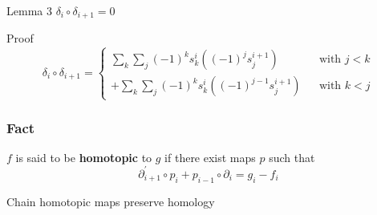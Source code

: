 \documentclass[10pt,xcolor=table,dvipsnames]{beamer}
\begin{document}
\begin{frame}[fragile]
        \begin{block}{Lemma 3}
        $\delta_{i}\circ \delta_{i+1}=0$
        \end{block}
        \begin{block}{Proof}
\begin{equation*}
\delta _{i}\circ \delta _{i+1}=\left\{
\begin{array}{ccc}
\sum\limits_{k}\sum\limits_{j}\left( -1\right) ^{k}s_{k}^{i}\left( \left(
-1\right) ^{j}s_{j}^{i+1}\right)  &  & \text{with }j<k \\
+\sum\limits_{k}\sum\limits_{j}\left( -1\right) ^{k}s_{k}^{i}\left( \left(
-1\right) ^{j-1}s_{j}^{i+1}\right)  &  & \text{with }k<j%
\end{array}%
\right.
\end{equation*}
        \end{block}
\end{frame}

\begin{frame}[fragile]
\frametitle{Fact}
\begin{center}
\end{center}

$f$ is said to be \textbf{homotopic} to $g$ if there exist maps $p$ such that
\begin{equation*}
\partial _{i+1}^{\prime }\circ p_{i}+p_{i-1}\circ \partial _{i}=g_{i}-f_{i}
\end{equation*}


Chain homotopic maps preserve homology
\end{frame}
\end{document}
